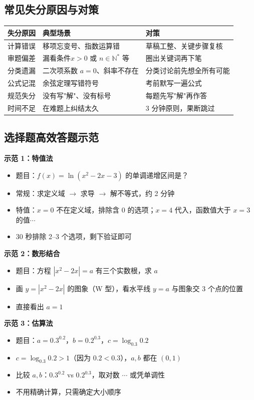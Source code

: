 \subsection{常见失分原因与对策}

\begin{center}
\begin{tabular}{p{4cm}|p{5cm}|p{5cm}}
\textbf{失分原因} & \textbf{典型场景} & \textbf{对策} \\ \hline
计算错误 & 移项忘变号、指数运算错 & 草稿工整、关键步骤复核 \\
审题偏差 & 漏看条件$x>0$ 或 $n\in\mathbb{N}^*$ 等 & 圈出关键词再下笔 \\
分类遗漏 & 二次项系数 $a=0$、斜率不存在 & 分类讨论前先想全所有可能 \\
公式记混 & 余弦定理写错符号 & 考前默写一遍公式 \\
规范失分 & 没有写"解"、没有标号 & 每题先写"解"再作答 \\
时间不足 & 在难题上纠结太久 & 3 分钟原则，果断跳过
\end{tabular}
\end{center}

\subsection{选择题高效答题示范}

\textbf{示范 1：特值法}
\begin{itemize}
  \item 题目：$f(x)=\ln(x^2-2x-3)$ 的单调递增区间是？
  \item 常规：求定义域 $\to$ 求导 $\to$ 解不等式，约 2 分钟
  \item 特值：$x=0$ 不在定义域，排除含 0 的选项；$x=4$ 代入，函数值大于 $x=3$ 的值$\cdots$
  \item 30 秒排除 2--3 个选项，剩下验证即可
\end{itemize}

\textbf{示范 2：数形结合}
\begin{itemize}
  \item 题目：方程 $|x^2-2x|=a$ 有三个实数根，求 $a$
  \item 画 $y=|x^2-2x|$ 的图象（W 型），看水平线 $y=a$ 与图象交 3 个点的位置
  \item 直接看出 $a=1$
\end{itemize}

\textbf{示范 3：估算法}
\begin{itemize}
  \item 题目：$a=0.3^{0.2}$，$b=0.2^{0.3}$，$c=\log_{0.3}0.2$
  \item $c=\log_{0.3}0.2 > 1$（因为 $0.2<0.3$），$a,b$ 都在 $(0,1)$
  \item 比较 $a,b$：$0.3^{0.2}$ vs $0.2^{0.3}$，取对数 $\cdots$ 或凭单调性
  \item 不用精确计算，只需确定大小顺序
\end{itemize}

